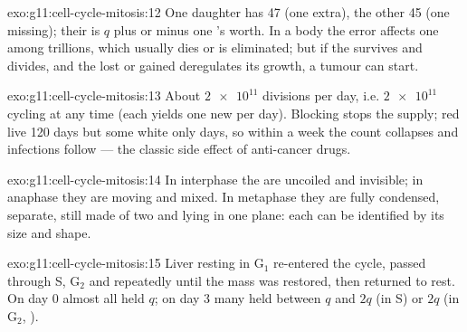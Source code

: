 \begin{solution}{exo:g11:cell-cycle-mitosis:12}
One daughter has 47  (one extra), the other 45 (one
missing); their  is $q$ plus or minus one 's worth. In a
body  the error affects one  among trillions, which usually
dies or is eliminated; but if the  survives and divides, and the
lost or gained  deregulates its growth, a tumour can start.
\end{solution}

\begin{solution}{exo:g11:cell-cycle-mitosis:13}
About $\num{2e11}$ divisions per day, i.e. $\num{2e11}$  cycling
at any time (each yields one new  per day). Blocking  stops
the supply; red  live 120 days but some white  only days, so
within a week the  count collapses and infections follow ---
the classic side effect of anti-cancer drugs.
\end{solution}

\begin{solution}{exo:g11:cell-cycle-mitosis:14}
In interphase the  are uncoiled and invisible; in anaphase
they are moving and mixed. In metaphase they are fully condensed,
separate, still made of two  and lying in one plane: each
can be identified by its size and shape.
\end{solution}

\begin{solution}{exo:g11:cell-cycle-mitosis:15}
Liver  resting in $\mathrm{G_1}$ re-entered the cycle, passed
through S, $\mathrm{G_2}$ and  repeatedly until the mass was
restored, then returned to rest. On day 0 almost all  held $q$;
on day 3 many held between $q$ and $2q$ (in S) or $2q$ (in
$\mathrm{G_2}$, ).
\end{solution}

